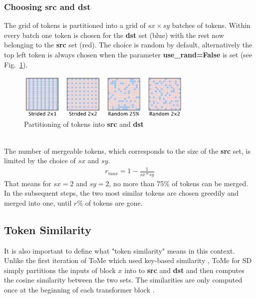\subsubsection*{Choosing src and dst}
The grid of tokens is partitioned into a grid of \(sx \times sy\) batches of tokens.
Within every batch one token is chosen for the \textbf{dst} set (blue) with the rest now belonging to the \textbf{src} set (red). The choice is random by default, alternatively the top left token is always chosen when the parameter \textbf{use\_rand=False} is set (see Fig.~\ref{fig:src-dst}).
\begin{figure}[!htb]
\centering
\includegraphics[width=0.75\textwidth]
{static/src_dst_part.png}
\caption{Partitioning of tokens into \textbf{src} and \textbf{dst} \cite[Fig. 5]{bolya2023tome}}
\label{fig:src-dst}
\end{figure}\\
The number of mergeable tokens, which corresponds to the size of the \textbf{src} set, is limited by the choice of \(sx\) and \(sy\).
\begin{align*}
    r_{max} = 1-\frac{1}{sx*sy}
\end{align*}
That means for \(sx = 2\) and \(sy = 2\), no more than 75\% of tokens can be merged.\\
In the subsequent steps, the two most similar tokens are chosen greedily and merged into one, until \(r\%\) of tokens are gone.



\subsection{Token Similarity}
It is also important to define what "token similarity" means in this context. Unlike the first iteration of ToMe which used key-based similarity \cite{bolya2023tome}, ToMe for SD simply partitions the inputs of block \(x\) into to \textbf{src} and \textbf{dst} and then computes the cosine similarity between the two sets. The similarities are only computed once at the beginning of each transformer block \cite{bolya2023tomesd}.




